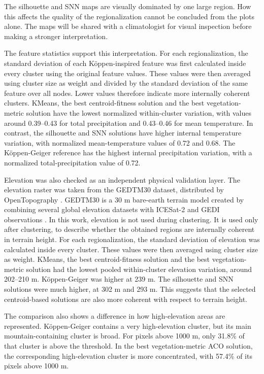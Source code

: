 \documentclass[11pt]{article}
\begin{document}
The silhouette and SNN maps are visually dominated by one large region. How this affects the quality of the regionalization cannot be concluded from the plots alone. The maps will be shared with a climatologist for visual inspection before making a stronger interpretation.

The feature statistics support this interpretation. For each regionalization, the standard deviation of each Köppen-inspired feature was first calculated inside every cluster using the original feature values. These values were then averaged using cluster size as weight and divided by the standard deviation of the same feature over all nodes. Lower values therefore indicate more internally coherent clusters. KMeans, the best centroid-fitness solution and the best vegetation-metric solution have the lowest normalized within-cluster variation, with values around 0.39--0.43 for total precipitation and 0.43--0.46 for mean temperature. In contrast, the silhouette and SNN solutions have higher internal temperature variation, with normalized mean-temperature values of 0.72 and 0.68. The Köppen-Geiger reference has the highest internal precipitation variation, with a normalized total-precipitation value of 0.72.

Elevation was also checked as an independent physical validation layer. The elevation raster was taken from the GEDTM30 dataset, distributed by OpenTopography \cite{ho2025gedtm30data}. GEDTM30 is a 30 m bare-earth terrain model created by combining several global elevation datasets with ICESat-2 and GEDI observations \cite{ho2025gedtm30}. In this work, elevation is not used during clustering. It is used only after clustering, to describe whether the obtained regions are internally coherent in terrain height. For each regionalization, the standard deviation of elevation was calculated inside every cluster. These values were then averaged using cluster size as weight. KMeans, the best centroid-fitness solution and the best vegetation-metric solution had the lowest pooled within-cluster elevation variation, around 202--210 m. Köppen-Geiger was higher at 239 m. The silhouette and SNN solutions were much higher, at 302 m and 293 m. This suggests that the selected centroid-based solutions are also more coherent with respect to terrain height.

The comparison also shows a difference in how high-elevation areas are represented. Köppen-Geiger contains a very high-elevation cluster, but its main mountain-containing cluster is broad. For pixels above 1000 m, only 31.8\% of that cluster is above the threshold. In the best vegetation-metric ACO solution, the corresponding high-elevation cluster is more concentrated, with 57.4\% of its pixels above 1000 m.
\end{document}
